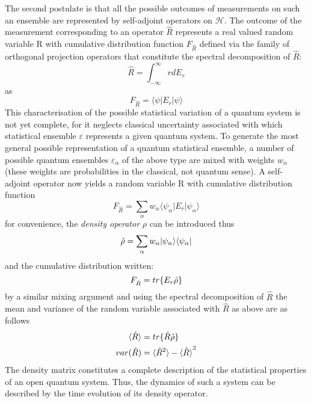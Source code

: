 The second postulate is that all the possible outcomes of measurements on such an ensemble are represented by self-adjoint operators on $\mathcal{H}$.
The outcome of the measurement corresponding to an operator $\hat{R}$ represents a real valued random variable R with cumulative distribution function $F_{\hat{R}}$ defined via the family of orthogonal projection operators that constitute the spectral decomposition of $\hat{R}$:
\begin{equation}
  \hat{R} = \int_{-\infty}^\infty rdE_r
\end{equation}
as
\begin{equation}
  F_{\hat{R}} = \langle \psi |E_r | \psi \rangle
\end{equation}
This characterisation of the possible statistical variation of a quantum system is not yet complete, for it neglects classical uncertainty associated with which statistical ensemble $\varepsilon$ represents a given quantum system.
To generate the most general possible representation of a quantum statistical ensemble, a number of possible quantum ensembles $\varepsilon_\alpha$ of the above type are mixed with weights $w_\alpha$ (these weights are probabilities in the classical, not quantum sense).
A self-adjoint operator now yields a random variable R with cumulative distribution function
\begin{equation}
  F_{\hat{R}} = \sum_\alpha w_\alpha \langle \psi_\alpha | E_r | \psi_\alpha \rangle
\end{equation}
for convenience, the \emph{density operator} $\rho$ can be introduced thus
\begin{equation}
  \hat{\rho} = \sum_\alpha w_\alpha |\psi_\alpha \rangle \langle \psi_\alpha |
\end{equation}
and the cumulative distribution written:
\begin{equation}
  F_{\hat{R}} = tr\{E_r \hat{\rho} \}
\end{equation}
by a similar mixing argument and using the spectral decomposition of $\hat{R}$ the mean and variance of the random variable associated with $\hat{R}$ as above are as follows
\begin{align}
  \langle \hat{R} \rangle &= tr\{\hat{R} \hat{\rho} \} \\
  var(\hat{R}) &= \langle \hat{R}^2 \rangle - {\langle \hat{R} \rangle}^2
\end{align}
The density matrix constitutes a complete description of the statistical properties of an open quantum system.
Thus, the dynamics of such a system can be described by the time evolution of its density operator.
